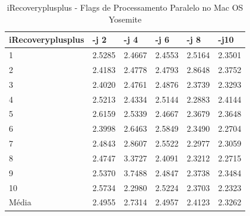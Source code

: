 \begin{table}[!ht]
\centering
\tiny
\caption{iRecoveryplusplus - Flags de Processamento Paralelo no Mac OS Yosemite}
\label{tab:flag_processamento_paralelo:mac:irecoveryplusplus}
\begin{tabular}{llllll}
\textbf{iRecoveryplusplus} & \textbf{-j 2} & \textbf{-j 4} & \textbf{-j 6} & \textbf{-j 8} & \textbf{-j10}  \\ \toprule
1                          & 2.5285        &  2.4667       &  2.4553       &  2.5164       &  2.3501    \\ 
2                          & 2.4183        &  2.4778       &  2.4793       &  2.8648       &  2.3752    \\ 
3                          & 2.4020        &  2.4761       &  2.4876       &  2.3739       &  2.3293    \\ 
4                          & 2.5213        &  2.4334       &  2.5144       &  2.2883       &  2.4144    \\ 
5                          & 2.6159        &  2.5339       &  2.4667       &  2.3679       &  2.3648    \\ 
6                          & 2.3998        &  2.6463       &  2.5849       &  2.3490       &  2.2704    \\ 
7                          & 2.4843        &  2.8607       &  2.5522       &  2.2977       &  2.3059    \\ 
8                          & 2.4747        &  3.3727       &  2.4091       &  2.3212       &  2.2715    \\ 
9                          & 2.5370        &  3.7488       &  2.4847       &  2.3738       &  2.3484    \\ 
10                         & 2.5734        &  2.2980       &  2.5224       &  2.3703       &  2.2323    \\ \bottomrule
Média                      & 2.4955        &  2.7314       &  2.4957       &  2.4123       &  2.3262    \\ 
\end{tabular}
\end{table}

